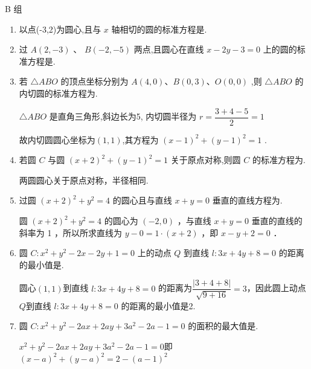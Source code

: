 B 组
\begin{enumerate}

    \item 以点(-3,2)为圆心,且与 $x$ 轴相切的圆的标准方程是.

    \item 过 $A\left( {2, - 3}\right)$ 、 $B\left( {-2, - 5}\right)$ 两点,且圆心在直线 $x - {2y} - 3 = 0$ 上的圆的标准方程是.

    \item 若 $\bigtriangleup {ABO}$ 的顶点坐标分别为 $A\left( {4,0}\right) \text{、}B\left( {0,3}\right) \text{、}O\left( {0,0}\right)$ ,则 $\bigtriangleup {ABO}$ 的内切圆的标准方程为.
    \begin{jieda}
        $\bigtriangleup {ABO}$ 是直角三角形,斜边长为5, 内切圆半径为 $r = \dfrac{3 + 4 - 5}{2} = 1$
        
        故内切圆圆心坐标为$(1,1)$,其方程为 ${\left( x - 1\right) }^{2} + {\left( y - 1\right) }^{2} = 1$ .
    \end{jieda}

    \item 若圆 $C$ 与圆 ${\left( x + 2\right) }^{2} + {\left( y - 1\right) }^{2} = 1$ 关于原点对称,则圆 $C$ 的标准方程为.
    \begin{jieda}
        两圆圆心关于原点对称，半径相同.
    \end{jieda}

    \item 过圆 ${\left( x + 2\right) }^{2} + {y}^{2} = 4$ 的圆心且与直线 $x + y = 0$ 垂直的直线方程为.
    \begin{jieda}
        圆 $(x+2)^2+y^2=4$ 的圆心为 $(-2,0)$ ，与直线 $x+y=0$ 垂直的直线的斜率为 1 ，所以所求直线为 $y-0=1 \cdot(x+2)$ ，即 $x-y+2=0$ ．
    \end{jieda}
    
    \item 圆 $C : {x}^{2} + {y}^{2} - {2x} - {2y} + 1 = 0$ 上的动点 $Q$ 到直线 $l : {3x} + {4y} + 8 = 0$ 的距离的最小值是.
    \begin{jieda}
        圆心$(1,1)$到直线 $l : {3x} + {4y} + 8 = 0$ 的距离为$\dfrac{|3+4+8|}{\sqrt{9+16}} = 3$，因此圆上动点$Q$到直线 $l : {3x} + {4y} + 8 = 0$ 的距离的最小值是2.
    \end{jieda}

    \item 圆 $C : {x}^{2} + {y}^{2} - {2ax} + {2ay} + 3{a}^{2} - {2a} - 1 = 0$ 的面积的最大值是\blkda[2]{$2\pi$}.
    \begin{jieda}
        ${x}^{2} + {y}^{2} - {2ax} + {2ay} + 3{a}^{2} - {2a} - 1 = 0$即$(x-a)^2+(y-a)^2 = 2-(a-1)^2$


\end{jieda}
\end{enumerate}
